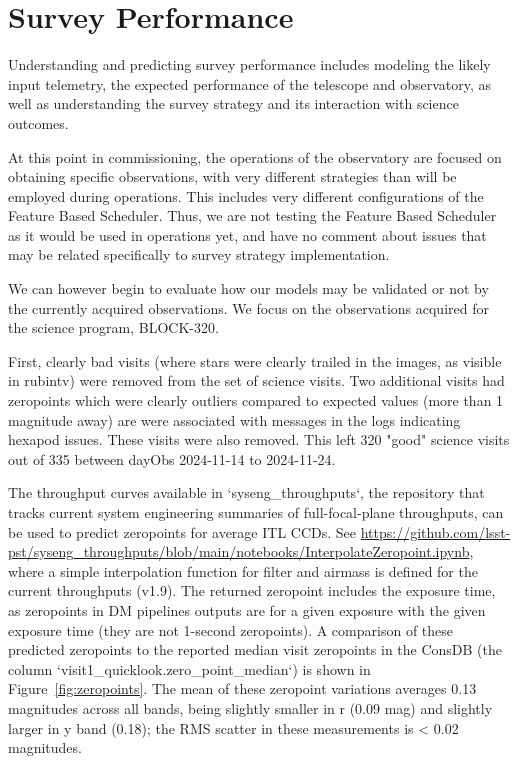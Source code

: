 \section{Survey Performance}
\label{sec:survey_performance}

Understanding and predicting survey performance includes modeling the likely input telemetry, the expected performance of the telescope and observatory, as well as understanding the survey strategy and its interaction with science outcomes. 

At this point in commissioning, the operations of the observatory are focused on obtaining specific observations, with very different strategies than will be employed during operations. This includes very different configurations of the Feature Based Scheduler. Thus, we are not testing the Feature Based Scheduler as it would be used in operations yet, and have no comment about issues that may be related specifically to survey strategy implementation. 

We can however begin to evaluate how our models may be validated or not by the currently acquired observations. We focus on the observations acquired for the science program, BLOCK-320.

First, clearly bad visits (where stars were clearly trailed in the images, as visible in rubintv) were removed from the set of science visits. Two additional visits had zeropoints which were clearly outliers compared to expected values (more than 1 magnitude away) are were associated with messages in the logs indicating hexapod issues. These visits were also removed. This left 320 "good" science visits out of 335 between dayObs 2024-11-14 to 2024-11-24. 

The throughput curves available in `syseng\_throughputs`, the repository that tracks current system engineering summaries of full-focal-plane throughputs, can be used to predict zeropoints for average ITL CCDs. See \url{https://github.com/lsst-pst/syseng\_throughputs/blob/main/notebooks/InterpolateZeropoint.ipynb}, where a simple interpolation function for filter and airmass is defined for the current throughputs (v1.9). The returned zeropoint includes the exposure time, as zeropoints in DM pipelines outputs are for a given exposure with the given exposure time (they are not 1-second zeropoints). A comparison of these predicted zeropoints to the reported median visit zeropoints in the ConsDB (the column `visit1\_quicklook.zero\_point\_median`) is shown in Figure~\ref{fig:zeropoints}. The mean of these zeropoint variations averages 0.13 magnitudes across all bands, being slightly smaller in r (0.09 mag) and slightly larger in y band (0.18); the RMS scatter in these measurements is < 0.02 magnitudes. 


